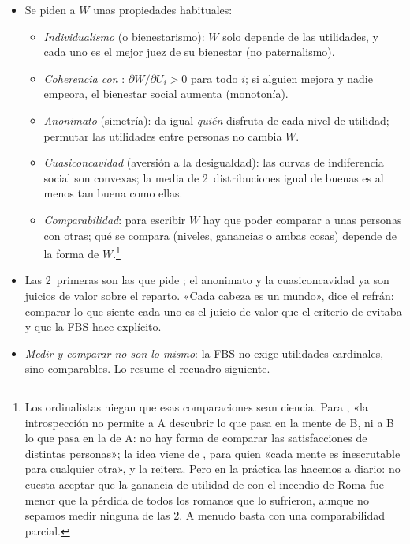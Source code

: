 \documentclass[11pt]{article}
\begin{document}
\begin{itemize}
\item Se piden a $W$ unas propiedades habituales:
  \begin{itemize}
  \item \emph{Individualismo} (o bienestarismo): $W$ solo depende de las utilidades, y cada uno es el mejor juez de su bienestar (no paternalismo).
  \item \emph{Coherencia con }: $\partial W/\partial U_i>0$ para todo $i$; si alguien mejora y nadie empeora, el bienestar social aumenta (monotonía).
  \item \emph{Anonimato} (simetría): da igual \emph{quién} disfruta de cada nivel de utilidad; permutar las utilidades entre personas no cambia $W$.
  \item \emph{Cuasiconcavidad} (aversión a la desigualdad): las curvas de indiferencia social son convexas; la media de 2~distribuciones igual de buenas es al menos tan buena como ellas.
  \item \emph{Comparabilidad}: para escribir $W$ hay que poder comparar a unas personas con otras; qué se compara (niveles, ganancias o ambas cosas) depende de la forma de $W$.\footnote{Los ordinalistas niegan que esas comparaciones sean ciencia. Para \textcite[124]{Robbins1935Essay}, «la introspección no permite a A descubrir lo que pasa en la mente de B, ni a B lo que pasa en la de A: no hay forma de comparar las satisfacciones de distintas personas»; la idea viene de \textcite{Jevons1871Theory}, para quien «cada mente es inescrutable para cualquier otra», y \textcite{Robbins1938Interpersonal} la reitera. Pero en la práctica las hacemos a diario: no cuesta aceptar que la ganancia de utilidad de  con el incendio de Roma fue menor que la pérdida de todos los romanos que lo sufrieron\nocite{Sen2003Possibility}, aunque no sepamos medir ninguna de las 2. A menudo basta con una comparabilidad parcial\nocite{Sen1970Collective}.}
  \end{itemize}
\item Las 2~primeras son las que pide \textcite{Samuelson1947Foundations}; el anonimato y la cuasiconcavidad ya son juicios de valor sobre el reparto. «Cada cabeza es un mundo», dice el refrán: comparar lo que siente cada uno es el juicio de valor que el criterio de  evitaba y que la FBS hace explícito.
\item \emph{Medir y comparar no son lo mismo}: la FBS no exige utilidades cardinales, sino comparables. Lo resume el recuadro siguiente.
\end{itemize}
\end{document}
